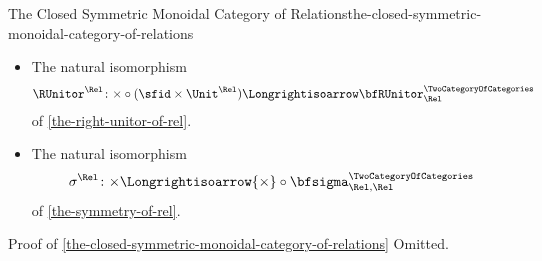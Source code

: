 \begin{proposition}{The Closed Symmetric Monoidal Category of Relations}{the-closed-symmetric-monoidal-category-of-relations}
\begin{itemize}
\[                \Longrightisoarrow
                \bfLUnitor^{\TwoCategoryOfCategories}_{\Rel}
            \]
            of \cref{the-left-unitor-of-rel}.
        \item{}The natural isomorphism
            \[
                \RUnitor^{\Rel}%
                \colon%
                {\times}\circ{({\sfid}\times{\Unit^{\Rel}})}%
                \Longrightisoarrow%
                \bfRUnitor^{\TwoCategoryOfCategories}_{\Rel}%
            \]
            of \cref{the-right-unitor-of-rel}.
        \item{}The natural isomorphism
            \[
                \sigma^{\Rel}
                \colon
                {\times}
                \Longrightisoarrow
                {\times}\circ{\bfsigma^{\TwoCategoryOfCategories}_{\Rel,\Rel}}
            \]
            of \cref{the-symmetry-of-rel}.
    \end{itemize}
\end{proposition}
\begin{Proof}{Proof of \cref{the-closed-symmetric-monoidal-category-of-relations}}%
    Omitted.
\end{Proof}
